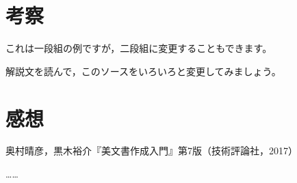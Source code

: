 \documentclass{jsarticle}
\begin{document}
\section{考察}

これは一段組の例ですが，二段組に変更することもできます。

解説文を読んで，このソースをいろいろと変更してみましょう。

\section{感想}

\begin{thebibliography}{99}
  \item 奥村晴彦，黒木裕介『\LaTeXe 美文書作成入門』第7版（技術評論社，2017）
  \item ……
\end{thebibliography}
\end{document}
